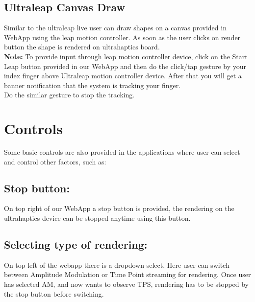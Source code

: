 \subsection*{Ultraleap Canvas Draw }
Similar to the ultraleap live user can draw shapes on a canvas provided in WebApp
 using the leap motion controller. As soon as the user clicks on render button the 
 shape is rendered on ultrahaptics board. \\[4mm]


\textbf{Note:} To provide input through leap motion controller device, click on the Start Leap 
button provided in our WebApp and then do the click/tap gesture by your index finger above 
Ultraleap motion controller device. 
After that you will get a banner notification that the system is tracking your finger.\\ 
Do the similar gesture to stop the tracking.\\


\section{Controls}
Some basic controls are also provided in the applications where user can select and 
control other factors, such as:\\
\subsection*{Stop button:} 
On top right of our WebApp a stop button is provided, the rendering on the ultrahaptics 
device can be stopped anytime using this button.\\
\subsection*{Selecting type of rendering:}
On top left of the webapp there is a dropdown select. Here user can switch between
Amplitude Modulation or Time Point streaming for rendering. Once user has selected 
AM, and now wants to observe TPS, rendering has to be stopped by the stop button
before switching.

